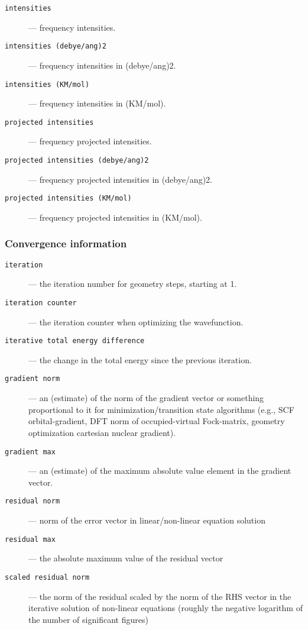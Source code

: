 \begin{description}
\item [\verb+intensities+] --- frequency intensities.
\item [\verb+intensities (debye/ang)2+] --- frequency intensities in (debye/ang)2.
\item [\verb+intensities (KM/mol)+] --- frequency intensities in (KM/mol).
\item [\verb+projected intensities+] --- frequency projected intensities.
\item [\verb+projected intensities (debye/ang)2+] --- frequency projected intensities 
  in (debye/ang)2.
\item [\verb+projected intensities (KM/mol)+] --- frequency projected intensities 
  in (KM/mol).
\end{description}

\subsubsection{Convergence information}

\begin{description}
\item [\verb+iteration+] --- the iteration number for geometry steps, starting at 1.
\item [\verb+iteration counter+] --- the iteration counter when optimizing the
  wavefunction.
\item [\verb+iterative total energy difference+] --- the change in the total 
  energy since the previous iteration.
\item [\verb+gradient norm+] --- an (estimate) of the norm of the
  gradient vector or something proportional to it for
  minimization/transition state algorithms (e.g., SCF
  orbital-gradient, DFT norm of occupied-virtual Fock-matrix, geometry
  optimization cartesian nuclear gradient).
\item [\verb+gradient max+] --- an (estimate) of the maximum absolute
  value element in the gradient vector.
\item [\verb+residual norm+] --- norm of the error vector in
  linear/non-linear equation solution
\item [\verb+residual max+] --- the absolute maximum value of the
  residual vector
\item [\verb+scaled residual norm+] --- the norm of the residual
  scaled by the norm of the RHS vector in the iterative solution of
  non-linear equations (roughly the negative logarithm of the number of
  significant figures)
\end{description}


